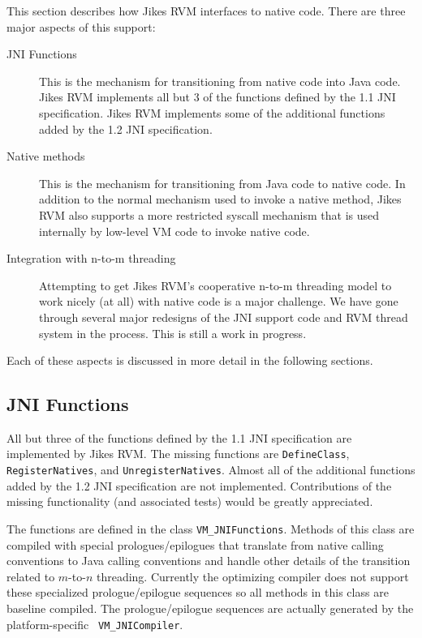 
This section describes how Jikes RVM interfaces to native code. There
are three major aspects of this support:
\begin{description}
\item[JNI Functions] This is the mechanism for transitioning from
native code into Java code.  Jikes RVM implements all but 3 of the
functions defined by the 1.1 JNI specification. Jikes RVM implements
some of the additional functions added by the 1.2 JNI
specification.
\item[Native methods] This is the mechanism for transitioning from
Java code to native code. In addition to the normal mechanism used to
invoke a native method, Jikes RVM also supports a more restricted
syscall mechanism that is used internally by low-level VM code to
invoke native code. 
\item[Integration with n-to-m threading] Attempting to get Jikes RVM's
cooperative n-to-m threading model to work nicely (at all) with native
code is a major challenge. We have gone through several major
redesigns of the JNI support code and RVM thread system in the
process. This is still a work in progress.
\end{description}
Each of these aspects is discussed in more detail in the following
sections. 

\subsection{JNI Functions}
All but three of the functions defined by the 1.1 JNI specification are
implemented by Jikes RVM. The missing functions are {\tt DefineClass},
{\tt RegisterNatives}, and {\tt UnregisterNatives}.  Almost all of the
additional functions added by the 1.2 JNI specification are not
implemented.  Contributions of the missing functionality (and
associated tests) would be greatly appreciated. 

The functions are defined in the class {\tt VM\_JNIFunctions}. Methods
of this class are compiled with special prologues/epilogues that
translate from native calling conventions to Java calling conventions
and handle other details of the transition related to $m$-to-$n$
threading.  Currently the optimizing compiler 
does not support these specialized prologue/epilogue sequences so all
methods in this class are baseline compiled.  The prologue/epilogue
sequences are actually generated by the platform-specific {\tt
VM\_JNICompiler}. 

